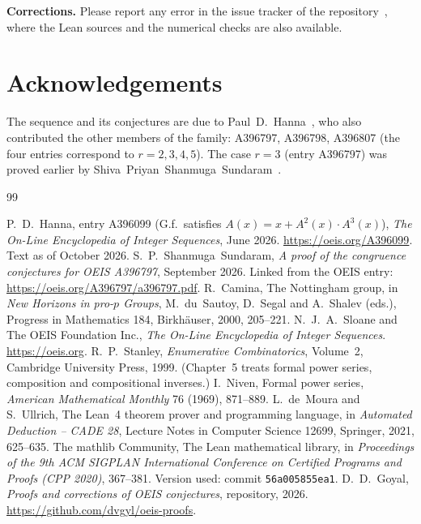 \documentclass[11pt,a4paper]{article}
\theoremstyle{definition}
\theoremstyle{remark}
\newcommand{\para}[1]{\par\medskip\noindent\textbf{#1}\enspace}
\begin{document}
\para{Corrections.} Please report any error in the issue tracker of the repository~\cite{repo}, where the Lean sources and the numerical checks are also
available.

\section*{Acknowledgements}
The sequence and its conjectures are due to Paul~D.~Hanna~\cite{oeis}, who also contributed the other members of the
family: A396797, A396798, A396807 (the four entries correspond to $r=2,3,4,5$). The case $r=3$ (entry A396797) was
proved earlier by Shiva~Priyan~Shanmuga~Sundaram~\cite{sundaram}. 

\begin{thebibliography}{99}\small
\raggedright
{} P.~D.~Hanna, entry A396099 (G.f.\ satisfies $A(x)=x+A^{2}(x)\cdot A^{3}(x)$), \emph{The On-Line Encyclopedia of Integer Sequences}, June 2026. \url{https://oeis.org/A396099}. Text as of October 2026.
 S.~P.~Shanmuga~Sundaram, \emph{A proof of the congruence conjectures for OEIS A396797}, September 2026. Linked from the OEIS entry: \url{https://oeis.org/A396797/a396797.pdf}.
 R.~Camina, The Nottingham group, in \emph{New Horizons in pro-$p$ Groups}, M.~du~Sautoy, D.~Segal and A.~Shalev (eds.), Progress in Mathematics 184, Birkh\"auser, 2000, 205--221.
 N.~J.~A.~Sloane and The OEIS Foundation Inc., \emph{The On-Line Encyclopedia of Integer Sequences}. \url{https://oeis.org}.
 R.~P.~Stanley, \emph{Enumerative Combinatorics}, Volume~2, Cambridge University Press, 1999. (Chapter~5 treats formal power series, composition and compositional inverses.)
 I.~Niven, Formal power series, \emph{American Mathematical Monthly} 76 (1969), 871--889.
 L.~de~Moura and S.~Ullrich, The Lean~4 theorem prover and programming language, in \emph{Automated Deduction -- CADE 28}, Lecture Notes in Computer Science 12699, Springer, 2021, 625--635.
 The mathlib Community, The Lean mathematical library, in \emph{Proceedings of the 9th ACM SIGPLAN International Conference on Certified Programs and Proofs (CPP 2020)}, 367--381. Version used: commit \texttt{56a005855ea1}.
 D.~D.~Goyal, \emph{Proofs and corrections of OEIS conjectures}, repository, 2026. \url{https://github.com/dvgyl/oeis-proofs}.
\end{thebibliography}
\end{document}

